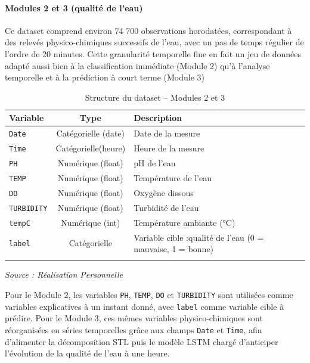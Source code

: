 \documentclass[a4paper,12pt, oneside]{article}
\begin{document}
\paragraph{Modules 2 et 3 (qualité de l'eau)\\}
Ce dataset comprend environ 74 700 observations horodatées, correspondant à des relevés physico-chimiques successifs de l'eau, avec un pas de temps régulier de l'ordre de 20 minutes. Cette granularité temporelle fine en fait un jeu de données adapté aussi bien à la classification immédiate (Module 2) qu'à l'analyse temporelle et à la prédiction à court terme (Module 3)

\begin{longtable}{|m{}|c|m{}|}
\hline
\textbf{Variable} & \textbf{Type} & \textbf{Description} \\
\hline


\texttt{Date} & Catégorielle (date) & Date de la mesure \\
\hline
\texttt{Time} & Catégorielle(heure) & Heure de la mesure \\
\hline
\texttt{PH} & Numérique (float) & pH de l'eau \\
\hline
\texttt{TEMP} & Numérique (float) & Température de l'eau \\
\hline
\texttt{DO} & Numérique (float) & Oxygène dissous \\
\hline
\texttt{TURBIDITY} & Numérique (float) & Turbidité de l'eau \\
\hline
\texttt{tempC} & Numérique (int) & Température ambiante (°C) \\
\hline
\texttt{label} & Catégorielle & Variable cible :qualité de l'eau (0 = mauvaise, 1 = bonne) \\
\hline
\caption{Structure du dataset -- Modules 2 et 3}\\
\end{longtable}
\begin{center}
\vspace{-0.85cm}
\textit{Source : Réalisation Personnelle}
\end{center}

Pour le Module 2, les variables \texttt{PH}, \texttt{TEMP}, \texttt{DO} et \texttt{TURBIDITY} sont utilisées comme variables explicatives à un instant donné, avec \texttt{label} comme variable cible à prédire.
Pour le Module 3, ces mêmes variables physico-chimiques sont réorganisées en séries temporelles grâce aux champs \texttt{Date} et \texttt{Time}, afin d'alimenter la décomposition STL puis le modèle LSTM chargé d'anticiper l'évolution de la qualité de l'eau à une heure.
\end{document}
